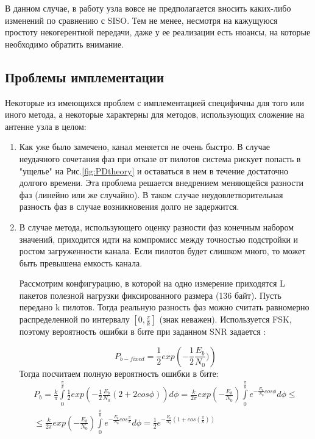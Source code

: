 \documentclass[a4paper,12pt,oneside, abstract=true]{scrartcl}
\begin{document}
В данном случае, в работу узла вовсе не предполагается вносить каких-либо изменений по сравнению с SISO. Тем не менее, несмотря на кажущуюся простоту некогерентной передачи, даже у ее реализации есть нюансы, на которые необходимо обратить внимание.

\subsection{Проблемы имплементации}

Некоторые из имеющихся проблем с имплементацией специфичны для того или иного метода, а некоторые характерны для методов, использующих сложение на антенне узла в целом:
\begin{enumerate}
\item Как уже было замечено, канал меняется не очень быстро.
В случае неудачного сочетания фаз при отказе от пилотов система рискует попасть в "ущелье" на Рис.\ref{fig:PDtheory} и оставаться в нем в течение достаточно долгого времени. 
Эта проблема решается внедрением меняющейся разности фаз (линейно или же случайно).
В таком случае неудовлетворительная разность фаз в случае возникновения долго не задержится.

\item В случае метода, использующего оценку разности фаз конечным набором значений, приходится идти на компромисс между точностью подстройки и ростом загруженности канала. Если пилотов будет слишком много, то может быть превышена емкость канала.

Рассмотрим конфигурацию, в которой на одно измерение приходятся L пакетов полезной нагрузки фиксированного размера (136 байт). 
Пусть передано k пилотов. 
Тогда реальную разность фаз можно считать равномерно распределенной по интервалу $\left[0, \frac{\pi}{k}\right]$ (знак неважен). 
Используется FSK, поэтому вероятность ошибки в бите при заданном SNR задается \cite{B2}:

\begin{equation}
P_{b-fixed} = \frac{1}{2}exp\left(-\frac{1}{2}\frac{E_b}{N_0})\right)
\label{eq:FSKBER}
\end{equation}
Тогда посчитаем полную вероятность ошибки в бите:
\begin{equation}
\begin{gathered}
P_b = \frac{k}{\pi}\int\limits_0^\frac{\pi}{k}\frac{1}{2}exp(-\frac{1}{2}\frac{E_b}{N_0}(2+2cos\phi))d\phi = \frac{k}{2\pi}exp(-\frac{E_b}{N_0})\int\limits_0^\frac{\pi}{k}e^{-\frac{E_b}{N_0}cos\phi}d\phi \leq \\
\leq \frac{k}{2\pi}exp(-\frac{E_b}{N_0})\int\limits_0^\frac{\pi}{k}e^{-\frac{E_b}{N_0}cos\frac{\pi}{k}}d\phi = \frac{1}{2}e^{-\frac{E_b}{N_0}(1+cos(\frac{\pi}{k}))}
\end{gathered}
\label{eq:FullBER}
\end{equation}


\end{enumerate}
\end{document}
